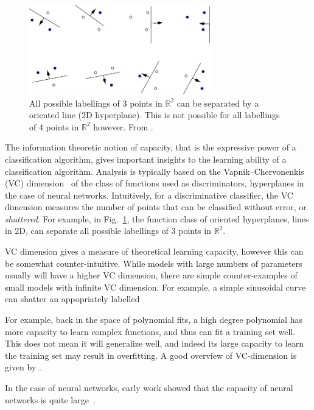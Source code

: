 \documentclass[thesis]{subfiles}
\begin{document}
    \begin{figure}
        \centering
        \includegraphics[width=0.7\textwidth]{Figs/PDF/vcdim_r2lines}
        \caption{All possible labellings of 3 points in $\mathbb{R}^2$ can be separated by a oriented line (2D hyperplane). This is not possible for all labellings of 4 points in $\mathbb{R}^2$ however. From \citet{burges1998tutorial}.}
        \label{fig:vcdim_r2line}
    \end{figure}
    The information theoretic notion of capacity, that is the expressive power of a classification algorithm, gives important insights to the learning ability of a classification algorithm. Analysis is typically based on the Vapnik–Chervonenkis (VC) dimension~\citep{vapnik2015uniform} of the class of functions used as discriminators, \eg hyperplanes in the case of neural networks. Intuitively, for a discriminative classifier, the VC dimension measures the number of points that can be classified without error, or \emph{shattered}. For example, in Fig.\ \ref{fig:vcdim_r2line}, the function class of oriented hyperplanes, \ie lines in 2D, can separate all possible labellings of 3 points in $\mathbb{R}^2$.

VC dimension gives a measure of theoretical learning capacity, however this can be somewhat counter-intuitive. While models with large numbers of parameters usually will have a higher VC dimension, there are simple counter-examples of small models with infinite VC dimension. For example, a simple sinusoidal curve can shatter an appopriately labelled

For example, back in the space of polynomial fits, a high degree polynomial has more capacity to learn complex functions, and thus can fit a training set well. This does not mean it will generalize well, and indeed its large capacity to learn the training set may result in overfitting. A good overview of VC-dimension is given by \citet{burges1998tutorial}.
    
    In the case of neural networks, early work showed that the capacity of neural networks is quite large~\citep{hornik89a,baum1989size}.
    
\end{document}
